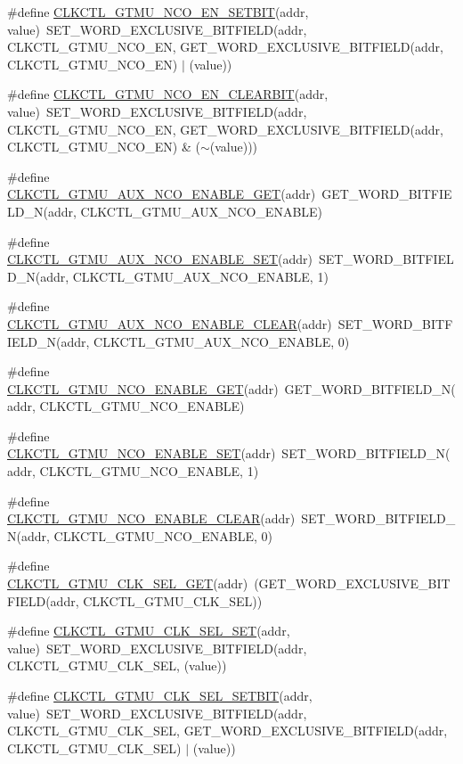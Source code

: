 \begin{DoxyCompactItemize}
\item 
\#define \hyperlink{a00544_a3ec972649d84bf9b8a6eff2eb984d61b}{CLKCTL\_\-GTMU\_\-NCO\_\-EN\_\-SETBIT}(addr, value)~SET\_\-WORD\_\-EXCLUSIVE\_\-BITFIELD(addr, CLKCTL\_\-GTMU\_\-NCO\_\-EN, GET\_\-WORD\_\-EXCLUSIVE\_\-BITFIELD(addr, CLKCTL\_\-GTMU\_\-NCO\_\-EN) $|$ (value))
\item 
\#define \hyperlink{a00544_adf6c4581e8e5479f3d3ac4b598c9408e}{CLKCTL\_\-GTMU\_\-NCO\_\-EN\_\-CLEARBIT}(addr, value)~SET\_\-WORD\_\-EXCLUSIVE\_\-BITFIELD(addr, CLKCTL\_\-GTMU\_\-NCO\_\-EN, GET\_\-WORD\_\-EXCLUSIVE\_\-BITFIELD(addr, CLKCTL\_\-GTMU\_\-NCO\_\-EN) \& ($\sim$(value)))
\item 
\#define \hyperlink{a00544_ac9422b008ddbe305ea4bc495c779b225}{CLKCTL\_\-GTMU\_\-AUX\_\-NCO\_\-ENABLE\_\-GET}(addr)~GET\_\-WORD\_\-BITFIELD\_\-N(addr, CLKCTL\_\-GTMU\_\-AUX\_\-NCO\_\-ENABLE)
\item 
\#define \hyperlink{a00544_a1daa649c4b08d2bad0b6c962d978dbfe}{CLKCTL\_\-GTMU\_\-AUX\_\-NCO\_\-ENABLE\_\-SET}(addr)~SET\_\-WORD\_\-BITFIELD\_\-N(addr, CLKCTL\_\-GTMU\_\-AUX\_\-NCO\_\-ENABLE, 1)
\item 
\#define \hyperlink{a00544_a29363babbd9d772059a75b27e9b69a97}{CLKCTL\_\-GTMU\_\-AUX\_\-NCO\_\-ENABLE\_\-CLEAR}(addr)~SET\_\-WORD\_\-BITFIELD\_\-N(addr, CLKCTL\_\-GTMU\_\-AUX\_\-NCO\_\-ENABLE, 0)
\item 
\#define \hyperlink{a00544_ac624262297ddccc916e36eb170a26047}{CLKCTL\_\-GTMU\_\-NCO\_\-ENABLE\_\-GET}(addr)~GET\_\-WORD\_\-BITFIELD\_\-N(addr, CLKCTL\_\-GTMU\_\-NCO\_\-ENABLE)
\item 
\#define \hyperlink{a00544_a429c9ef6657e605ef7ad29cff524c3a3}{CLKCTL\_\-GTMU\_\-NCO\_\-ENABLE\_\-SET}(addr)~SET\_\-WORD\_\-BITFIELD\_\-N(addr, CLKCTL\_\-GTMU\_\-NCO\_\-ENABLE, 1)
\item 
\#define \hyperlink{a00544_ad26d9f25b1f9d094341321662f1c3e8c}{CLKCTL\_\-GTMU\_\-NCO\_\-ENABLE\_\-CLEAR}(addr)~SET\_\-WORD\_\-BITFIELD\_\-N(addr, CLKCTL\_\-GTMU\_\-NCO\_\-ENABLE, 0)
\item 
\#define \hyperlink{a00544_a9516c17869be9aea61e960d4e3a9ff18}{CLKCTL\_\-GTMU\_\-CLK\_\-SEL\_\-GET}(addr)~(GET\_\-WORD\_\-EXCLUSIVE\_\-BITFIELD(addr, CLKCTL\_\-GTMU\_\-CLK\_\-SEL))
\item 
\#define \hyperlink{a00544_a1432dbb83d7420240868ae5971733081}{CLKCTL\_\-GTMU\_\-CLK\_\-SEL\_\-SET}(addr, value)~SET\_\-WORD\_\-EXCLUSIVE\_\-BITFIELD(addr, CLKCTL\_\-GTMU\_\-CLK\_\-SEL, (value))
\item 
\#define \hyperlink{a00544_a83cbd31ce826454639db877362e20862}{CLKCTL\_\-GTMU\_\-CLK\_\-SEL\_\-SETBIT}(addr, value)~SET\_\-WORD\_\-EXCLUSIVE\_\-BITFIELD(addr, CLKCTL\_\-GTMU\_\-CLK\_\-SEL, GET\_\-WORD\_\-EXCLUSIVE\_\-BITFIELD(addr, CLKCTL\_\-GTMU\_\-CLK\_\-SEL) $|$ (value))

\end{DoxyCompactItemize}
